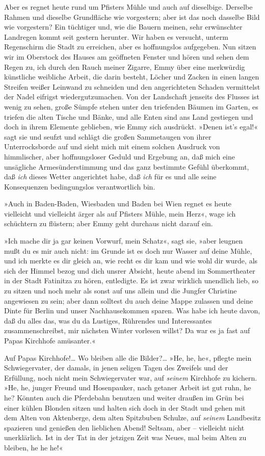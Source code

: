 Aber es regnet heute rund um Pfisters Mühle und auch auf
dieselbige. Derselbe Rahmen und dieselbe Grundfläche wie
vorgestern; aber ist das noch dasselbe Bild wie vorgestern? Ein
tüchtiger und, wie die Bauern meinen, sehr erwünschter Landregen
kommt seit gestern herunter. Wir haben es versucht, unterm
Regenschirm die Stadt zu erreichen, aber es hoffnungslos
aufgegeben. Nun sitzen wir im Oberstock des Hauses am geöffneten
Fenster und hören und sehen dem Regen zu, ich durch den Rauch
meiner Zigarre, Emmy über eine merkwürdig künstliche weibliche
Arbeit, die darin besteht, Löcher und Zacken in einen langen
Streifen weißer Leinwand zu schneiden und den angerichteten Schaden
vermittelst der Nadel eifrigst wiedergutzumachen. Von der
Landschaft jenseits des Flusses ist wenig zu sehen, große Sümpfe
stehen unter den triefenden Bäumen im Garten, es triefen die alten
Tische und Bänke, und alle Enten sind ans Land gestiegen und doch
in ihrem Elemente geblieben, wie Emmy sich ausdrückt. »Denen ist's
egal!« sagt sie und seufzt und schlägt die großen Sammetaugen von
ihrer Unterrocksborde auf und sieht mich mit einem solchen Ausdruck
von himmlischer, aber hoffnungsloser Geduld und Ergebung an, daß
mich eine unsägliche Armesünderstimmung und das ganz bestimmte
Gefühl überkommt, daß \emph{ich} dieses Wetter angerichtet habe,
daß \emph{ich} für es und alle seine Konsequenzen bedingungslos
verantwortlich bin.

»Auch in Baden-Baden, Wiesbaden und Baden bei Wien regnet es heute
vielleicht und vielleicht ärger als auf Pfisters Mühle, mein Herz«,
wage ich schüchtern zu flüstern; aber Emmy geht durchaus nicht
darauf ein.

»Ich mache dir ja gar keinen Vorwurf, mein Schatz«, sagt sie, »aber
leugnen mußt du es mir auch nicht: im Grunde ist es doch nur Wasser
auf deine Mühle, und ich merkte es dir gleich an, wie recht es dir
kam und wie wohl dir wurde, als sich der Himmel bezog und dich
unsrer Absicht, heute abend im Sommertheater in der Stadt Fatinitza
zu hören, entledigte. Es ist zwar wirklich unendlich lieb, so zu
sitzen und noch mehr als sonst auf uns allein und die Jungfer
Christine angewiesen zu sein; aber dann solltest du auch deine
Mappe zulassen und deine Dinte für Berlin und unser Nachhausekommen
sparen. Was habe ich heute davon, daß du alles das, was du da
Lustiges, Rührendes und Interessantes zusammenschreibst, mir
nächsten Winter vorlesen willst? Da war es ja fast auf Papas
Kirchhofe amüsanter.«

Auf Papas Kirchhofe!\ldots{} Wo bleiben alle die Bilder?\ldots{} »He, he,
he«, pflegte mein Schwiegervater, der damals, in jenen seligen
Tagen des Zweifels und der Erfüllung, noch nicht mein
Schwiegervater war, auf \emph{seinem} Kirchhofe zu kichern. »He,
he, junger Freund und Hosenpauker, nach getaner Arbeit ist gut
ruhn, he he? Könnten auch die Pferdebahn benutzen und weiter
draußen im Grün bei einer kühlen Blonden sitzen und halten sich
doch in der Stadt und gehen mit dem Alten von Aktenberge, dem alten
Spitzbuben Schulze, auf \emph{seinem} Landbesitz spazieren und
genießen den lieblichen Abend! Seltsam, aber – vielleicht nicht
unerklärlich. Ist in der Tat in der jetzigen Zeit was Neues, mal
beim Alten zu bleiben, he he he!«

